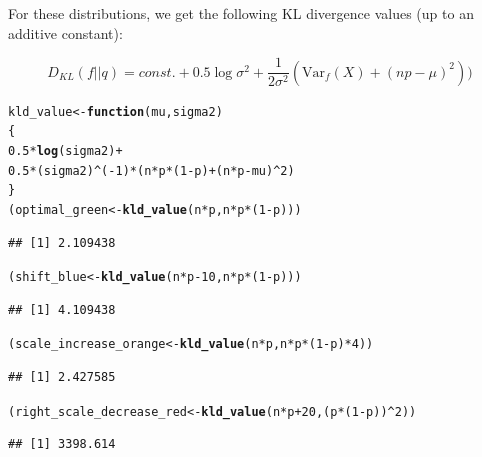 \documentclass[a4paper]{article}
\makeatletter
\newcommand{\hlnum}[1]{\textcolor[rgb]{0.686,0.059,0.569}{#1}}%
\newcommand{\hlopt}[1]{\textcolor[rgb]{0,0,0}{#1}}%
\newcommand{\hlstd}[1]{\textcolor[rgb]{0.345,0.345,0.345}{#1}}%
\newcommand{\hlkwa}[1]{\textcolor[rgb]{0.161,0.373,0.58}{\textbf{#1}}}%
\newcommand{\hlkwb}[1]{\textcolor[rgb]{0.69,0.353,0.396}{#1}}%
\newcommand{\hlkwc}[1]{\textcolor[rgb]{0.333,0.667,0.333}{#1}}%
\newcommand{\hlkwd}[1]{\textcolor[rgb]{0.737,0.353,0.396}{\textbf{#1}}}%
\newenvironment{kframe}{%
 \def\at@end@of@kframe{}%
 \ifinner\ifhmode%
  \def\at@end@of@kframe{\end{minipage}}%
  \begin{minipage}{\columnwidth}%
 \fi\fi%
 \def\FrameCommand##1{\hskip\@totalleftmargin \hskip-\fboxsep
 \colorbox{shadecolor}{##1}\hskip-\fboxsep
     \hskip-\linewidth \hskip-\@totalleftmargin \hskip\columnwidth}%
 \MakeFramed {\advance\hsize-\width
   \@totalleftmargin\z@ \linewidth\hsize
   \@setminipage}}%
 {\par\unskip\endMakeFramed%
 \at@end@of@kframe}
\newenvironment{knitrout}{}{} %
\makeatother
\begin{document}
{\begin{enumerate}
For these distributions, we get the following KL divergence values (up to an additive constant):

$$
D_{KL}(f||q) = const. + 0.5 \log \sigma^2 + \frac{1}{2\sigma^2} (\text{Var}_f(X) + (np-\mu)^2))
$$

\begin{knitrout}
\color{fgcolor}\begin{kframe}
\begin{alltt}
\hlstd{kld_value} \hlkwb{<-} \hlkwa{function}\hlstd{(}\hlkwc{mu}\hlstd{,}\hlkwc{sigma2}\hlstd{)}
\hlstd{\{}
  \hlnum{0.5}\hlopt{*}\hlkwd{log}\hlstd{(sigma2)} \hlopt{+}
    \hlnum{0.5} \hlopt{*} \hlstd{(sigma2)}\hlopt{^}\hlstd{(}\hlopt{-}\hlnum{1}\hlstd{)} \hlopt{*} \hlstd{(n}\hlopt{*}\hlstd{p}\hlopt{*}\hlstd{(}\hlnum{1}\hlopt{-}\hlstd{p)} \hlopt{+} \hlstd{(n}\hlopt{*}\hlstd{p} \hlopt{-} \hlstd{mu)}\hlopt{^}\hlnum{2}\hlstd{)}
\hlstd{\}}
\hlstd{(optimal_green} \hlkwb{<-} \hlkwd{kld_value}\hlstd{(n}\hlopt{*}\hlstd{p,n}\hlopt{*}\hlstd{p}\hlopt{*}\hlstd{(}\hlnum{1}\hlopt{-}\hlstd{p)))}
\end{alltt}
\begin{verbatim}
## [1] 2.109438
\end{verbatim}
\begin{alltt}
\hlstd{(shift_blue} \hlkwb{<-} \hlkwd{kld_value}\hlstd{(n}\hlopt{*}\hlstd{p}\hlopt{-}\hlnum{10}\hlstd{,n}\hlopt{*}\hlstd{p}\hlopt{*}\hlstd{(}\hlnum{1}\hlopt{-}\hlstd{p)))}
\end{alltt}
\begin{verbatim}
## [1] 4.109438
\end{verbatim}
\begin{alltt}
\hlstd{(scale_increase_orange} \hlkwb{<-} \hlkwd{kld_value}\hlstd{(n}\hlopt{*}\hlstd{p,n}\hlopt{*}\hlstd{p}\hlopt{*}\hlstd{(}\hlnum{1}\hlopt{-}\hlstd{p)}\hlopt{*}\hlnum{4}\hlstd{))}
\end{alltt}
\begin{verbatim}
## [1] 2.427585
\end{verbatim}
\begin{alltt}
\hlstd{(right_scale_decrease_red} \hlkwb{<-} \hlkwd{kld_value}\hlstd{(n}\hlopt{*}\hlstd{p}\hlopt{+}\hlnum{20}\hlstd{, (p}\hlopt{*}\hlstd{(}\hlnum{1}\hlopt{-}\hlstd{p))}\hlopt{^}\hlnum{2}\hlstd{))}
\end{alltt}
\begin{verbatim}
## [1] 3398.614
\end{verbatim}
\end{kframe}
\end{knitrout}


\end{enumerate}}
\end{document}
